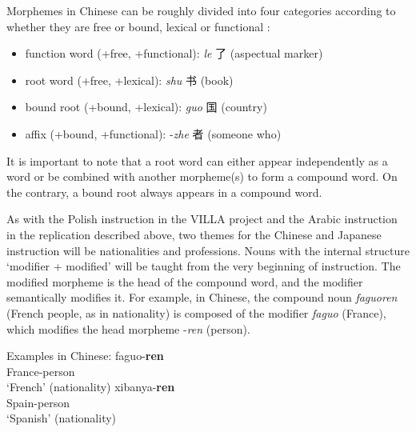 \documentclass[output=paper,colorlinks,citecolor=brown,modfonts,nonflat]{../langscibook}
\begin{document}

\label{sec:watorek:4.2.2.2.1}

Morphemes in Chinese can be roughly divided into four categories according to whether they are free or bound, lexical or functional \citep{Packard2000}: 

\begin{itemize}
    \item function word (+free, +functional): \textit{le} {\cjkfont 了} (aspectual marker)
    \item root word (+free, +lexical): \textit{shu} {\cjkfont 书} (book)
    \item bound root (+bound, +lexical): \textit{guo} {\cjkfont 国} (country)
    \item affix (+bound, +functional): -\textit{zhe} {\cjkfont 者} (someone who)
\end{itemize}

It is important to note that a root word can either appear independently as a word or be combined with another morpheme(s) to form a compound word. On the contrary, a bound root always appears in a compound word.

As with the Polish instruction in the VILLA project and the Arabic instruction in the replication described above, two themes for the Chinese and Japanese instruction will be nationalities and professions. Nouns with the internal structure ‘modifier + modified’ will be taught from the very beginning of instruction. The modified morpheme is the head of the compound word, and the modifier semantically modifies it. For example, in Chinese, the compound noun \textit{faguoren} (French people, as in nationality) is composed of the modifier \textit{faguo} (France), which modifies the head morpheme -\textit{ren} (person).

\ea%
    \label{ex:watorek:8}
    Examples in Chinese:
    \ea%
    \label{ex:watorek:8a}
        \gll    faguo-\textbf{{ren}}\\
                France-{person}\\
        \glt    ‘French’ (nationality)
    \ex%
    \label{ex:watorek:8b}
        \gll    xibanya-\textbf{{ren}}\\
                Spain-{person}\\
        \glt    ‘Spanish’ (nationality)
    \z
\z
\end{document}
